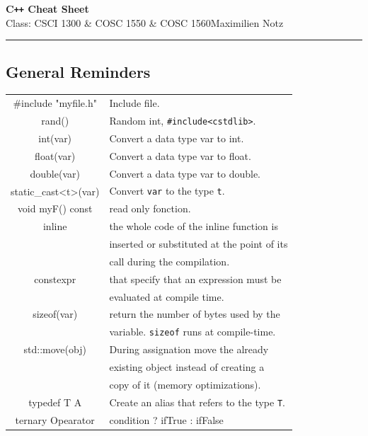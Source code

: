 \documentclass[5pt]{article}
\begin{document}
\begin{center}
    \Large{\textbf{C\texttt{++} Cheat Sheet}}\\
    \small{Class: CSCI 1300 \& COSC 1550 \& COSC 1560}\hfill\small{\textcopyright Maximilien Notz \the\year{}}
    \hspace*{-\dimexpr\oddsidemargin+1in\relax}\rule{\paperwidth}{0.4pt}
\end{center}
\begin{multicols}{2}
\setcounter{secnumdepth}{0}


\subsection{General Reminders}
\begin{tabular}{C L}

\#include "myfile.h"    & Include file.\\
rand()                  & Random int, \texttt{\#include<cstdlib>}.\\
int(var)                & Convert a data type var to int.\\
float(var)              & Convert a data type var to float.\\
double(var)             & Convert a data type var to double.\\
static\_cast<t>(var)    & Convert \texttt{var} to the type \texttt{t}.\\
void myF() const        & read only fonction.\\
inline                  & the whole code of the inline function is\\
                        & inserted or substituted at the point of its\\
                        & call during the compilation.\\
constexpr               & that specify that an expression must be\\
                        & evaluated at compile time.\\
sizeof(var)             & return the number of bytes used by the\\
                        & variable. \texttt{sizeof} runs at compile-time.\\
std::move(obj)          & During assignation move the already\\
                        & existing object instead of creating a\\
                        & copy of it (memory optimizations).\\    
typedef T A             & Create an alias that refers to the type \texttt{T}. \\  
ternary Opearator       & condition ? ifTrue : ifFalse\\
\end{tabular}



\end{multicols}
\end{document}
